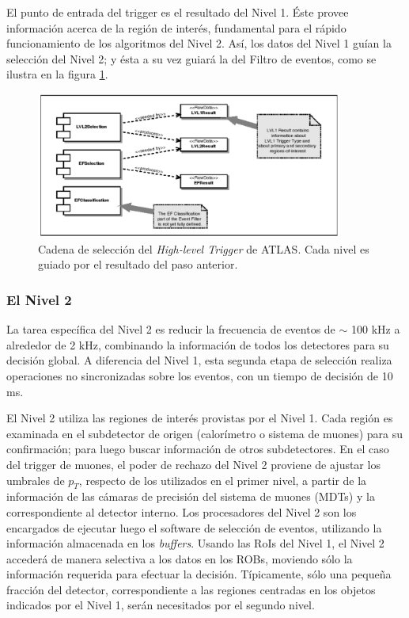    El punto de entrada del trigger es el resultado del Nivel 1. \'Este provee informaci\'on acerca de la regi\'on de inter\'es, fundamental para el r\'apido funcionamiento de los algoritmos del Nivel 2. As\'i, los datos del Nivel 1 gu\'ian la selecci\'on del Nivel 2; y \'esta a su vez guiar\'a la del Filtro de eventos, como se ilustra en la figura \ref{fig:HLTchainseed}. 
\begin{figure}[!h]
\begin{center}
\includegraphics[width=0.9\textwidth]{Fig3/HLTchain_seeding.pdf} 
\caption{Cadena de selecci\'on del \emph{High-level Trigger} de ATLAS. Cada nivel es guiado por el resultado del paso anterior.}
\label{fig:HLTchainseed}
\end{center}
\end{figure}


\subsubsection{El Nivel 2}
   La tarea espec\'ifica del Nivel 2 es reducir la frecuencia de eventos de $\sim$ 100 kHz a alrededor de 2 kHz, combinando la informaci\'on de todos los detectores para su decisi\'on global. A diferencia del Nivel 1, esta segunda etapa de selecci\'on realiza operaciones no sincronizadas sobre los eventos, con un tiempo de decisi\'on de 10 ms.

   El Nivel 2 utiliza las regiones de inter\'es provistas por el Nivel 1. Cada regi\'on es examinada en el subdetector de origen (calor\'imetro o sistema de muones) para su confirmaci\'on; para luego buscar informaci\'on de otros subdetectores. En el caso del trigger de muones, el poder de rechazo del Nivel 2 proviene de ajustar los umbrales de $p_{T}$, respecto de los utilizados en el primer nivel, a partir de la informaci\'on de las c\'amaras de precisi\'on del sistema de muones (MDTs) y la correspondiente al detector interno.
Los procesadores del Nivel 2 son los encargados de ejecutar luego el software de selecci\'on de eventos, utilizando la informaci\'on almacenada en los \emph{buffers}. Usando las RoIs del Nivel 1, el Nivel 2 acceder\'a de manera selectiva a los datos en los ROBs, moviendo s\'olo la informaci\'on requerida para efectuar la decisi\'on. T\'ipicamente, s\'olo una peque\~na fracci\'on del detector, correspondiente a las regiones centradas en los objetos indicados por el Nivel 1, ser\'an necesitados por el segundo nivel.

